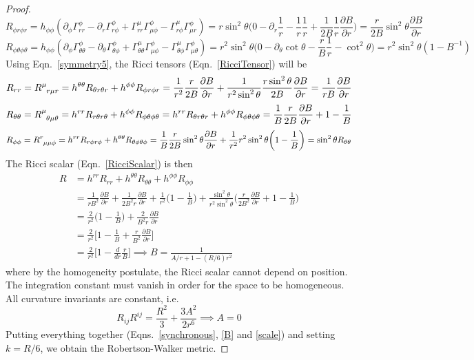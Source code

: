 \documentclass[a4paper]{article}
\theoremstyle{new}
\begin{document}
\begin{proof}
$$R_{\phi r\phi r}=h_{\phi\phi}(\partial_\phi\Gamma^\phi_{rr}-\partial_r\Gamma^\phi_{r\phi}+\Gamma^\mu_{rr}\Gamma^\phi_{\mu\phi}-\Gamma^\mu_{r\phi}\Gamma^\phi_{\mu r})=r\sin^2\theta\bigg(0-\partial_r\frac{1}{r}-\frac{1}{r}\frac{1}{r}+\frac{1}{2B}\frac{1}{r}\frac{\partial B}{\partial r}\bigg)=\frac{r}{2B}\sin^2\theta\frac{\partial B}{\partial r}$$
$$R_{\phi\theta\phi \theta}=h_{\phi\phi}(\partial_\phi\Gamma^\phi_{\theta\theta}-\partial_\theta\Gamma^\phi_{\theta\phi}+\Gamma^\mu_{\theta\theta}\Gamma^\phi_{\mu\phi}-\Gamma^\mu_{\theta\phi}\Gamma^\phi_{\mu\theta})=r^2\sin^2\theta\bigg(0-\partial_\theta\cot\theta-\frac{r}{B}\frac{1}{r}-\cot^2\theta\bigg)=r^2\sin^2\theta(1-B^{-1})$$
Using Eqn.~\ref{symmetry5}, the Ricci tensors (Eqn.~\ref{RicciTensor}) will be
$$R_{rr}=\tensor*{R}{*_{}^{\mu}_{r\mu r}}=h^{\theta\theta}R_{\theta r\theta r}+h^{\phi\phi}R_{\phi r \phi r}=\frac{1}{r^2}\frac{r}{2B}\frac{\partial B}{\partial r}+\frac{1}{r^2\sin^2\theta}\frac{r\sin^2\theta}{2B}\frac{\partial B}{\partial r}=\frac{1}{rB}\frac{\partial B}{\partial r}$$
$$R_{\theta\theta}=\tensor*{R}{*_{}^{\mu}_{\theta\mu\theta}}=h^{rr}R_{r\theta r\theta}+h^{\phi\phi}R_{\phi\theta \phi\theta}=h^{rr}R_{\theta r\theta r}+h^{\phi\phi}R_{\phi\theta\phi\theta}=\frac{1}{B}\frac{r}{2B}\frac{\partial B}{\partial r}+1-\frac{1}{B}$$
$$R_{\phi\phi}=\tensor*{R}{*_{}^{r}_{\mu \mu\phi}}=h^{rr}R_{r\phi r\phi}+h^{\theta\theta}R_{\theta\phi\theta \phi}=\frac{1}{B}\frac{r}{2B}\sin^2\theta\frac{\partial B}{\partial r}+\frac{1}{r^2}r^2\sin^2\theta\bigg(1-\frac{1}{B}\bigg)=\sin^2\theta R_{\theta\theta}$$
The Ricci scalar (Eqn.~\ref{RicciScalar}) is then
\begin{align}
    R&=h^{rr}R_{rr}+h^{\theta\theta}R_{\theta\theta}+h^{\phi\phi}R_{\phi\phi}\nonumber\\&=\frac{1}{rB^2}\frac{\partial B}{\partial r}+\frac{1}{2B^2r}\frac{\partial B}{\partial r}+\frac{1}{r^2}\bigg(1-\frac{1}{B}\bigg)+\frac{\sin^2\theta}{r^2\sin^2\theta}\bigg(\frac{r}{2B^2}\frac{\partial B}{\partial r}+1-\frac{1}{B}\bigg)\nonumber\\&=\frac{2}{r^2}\bigg(1-\frac{1}{B}\bigg)+\frac{2}{B^2r}\frac{\partial B}{\partial r}\nonumber\\&=\frac{2}{r^2}\bigg[1-\frac{1}{B}+\frac{r}{B^2}\frac{\partial B}{\partial r}\bigg]\nonumber\\&=\frac{2}{r^2}\bigg[1-\frac{d}{dr}\frac{r}{B}\bigg]\implies B=\frac{1}{A/r+1-(R/6)r^2}\label{B}
\end{align}
where by the homogeneity postulate, the Ricci scalar cannot depend on position.  The integration constant must vanish in order for the space to be homogeneous. All curvature invariants are constant, i.e.
$$R_{ij}R^{ij}=\frac{R^2}{3}+\frac{3A^2}{2r^6}\implies A=0$$
Putting everything together (Eqns.~\ref{synchronous}, \ref{B} and \ref{scale}) and setting $k=R/6$, we obtain the Robertson-Walker metric.
\end{proof}
\end{document}
